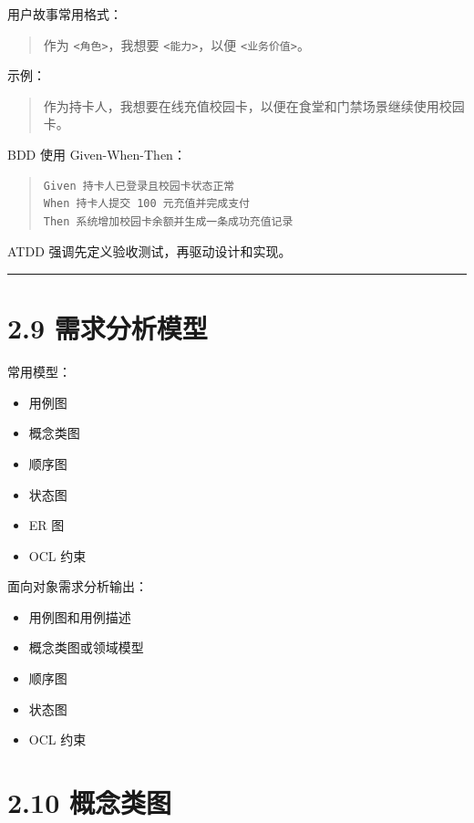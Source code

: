 \documentclass[UTF8,zihao=-4]{ctexart}
\begin{document}
用户故事常用格式：

\begin{quote}
作为 \texttt{<角色>}，我想要 \texttt{<能力>}，以便 \texttt{<业务价值>}。
\end{quote}

示例：

\begin{quote}
作为持卡人，我想要在线充值校园卡，以便在食堂和门禁场景继续使用校园卡。
\end{quote}

BDD 使用 Given-When-Then：

\begin{quote}
\footnotesize
\begin{verbatim}
Given 持卡人已登录且校园卡状态正常
When 持卡人提交 100 元充值并完成支付
Then 系统增加校园卡余额并生成一条成功充值记录
\end{verbatim}
\end{quote}

ATDD 强调先定义验收测试，再驱动设计和实现。

\bigskip\hrule\bigskip

\section{2.9 需求分析模型}

常用模型：

\begin{itemize}
\item 用例图
\item 概念类图
\item 顺序图
\item 状态图
\item ER 图
\item OCL 约束
\end{itemize}

面向对象需求分析输出：

\begin{itemize}
\item 用例图和用例描述
\item 概念类图或领域模型
\item 顺序图
\item 状态图
\item OCL 约束
\end{itemize}

\section{2.10 概念类图}
\end{document}
